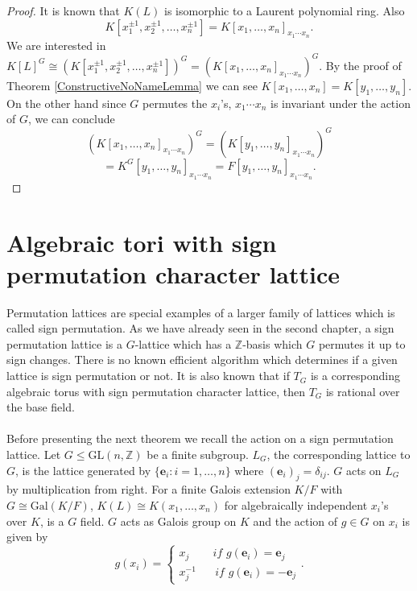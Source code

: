 \documentclass{article}
\theoremstyle{plain}
\theoremstyle{definition}
\newcommand{\Z}{\ensuremath{\mathbb{Z}}}
\begin{document}
\begin{proof}
It is known that $K(L)$ is isomorphic to a Laurent polynomial ring. Also $$K[x^{\pm 1}_1, x^{\pm 1}_2, \ldots , x^{\pm 1}_n] = K[x_1, \ldots , x_n]_{x_1\cdots x_n}.$$ We are interested in $K[L]^G \cong \left( K[x^{\pm 1}_1, x^{\pm 1}_2, \ldots , x^{\pm 1}_n] \right)^G = \left(K[x_1, \ldots , x_n]_{x_1\cdots x_n} \right) ^G.$ By the proof of Theorem \ref{ConstructiveNoNameLemma} we can see $K[x_1, \ldots , x_n] = K[y_1, \ldots , y_n]$. 
On the other hand since $G$ permutes the $x_i$'s, $x_1\cdots x_n$ is invariant under the action of $G$, we can conclude $$\left( K[x_1, \ldots , x_n]_{x_1\cdots x_n}\right)^G =  \left( K[y_1, \ldots , y_n]_{x_1\cdots x_n} \right)^G$$$$ = K^G [y_1, \ldots , y_n]_{x_1\cdots x_n} =  F[y_1, \ldots , y_n]_{x_1\cdots x_n}.$$ 
\end{proof}

\section{Algebraic tori with sign permutation character lattice}
Permutation lattices are special examples of a larger family of lattices which is called sign permutation. As we have already seen in the second chapter, a sign permutation lattice is a $G$-lattice which has a $\Z$-basis which $G$ permutes it up to sign changes. There is no known efficient algorithm which determines if a given lattice is sign permutation or not. It is also known that if $T_G$ is a corresponding algebraic torus with sign permutation character lattice, then $T_G$ is rational over the base field. \\
\\
Before presenting the next theorem we recall the action on a sign permutation lattice. Let $G \leq \mathrm{GL}(n,\Z)$ be a finite subgroup. $L_G$, the corresponding lattice to $G$, is the lattice generated by $\lbrace \textbf{e}_i: i = 1, \ldots , n \rbrace$ where $(\textbf{e}_i)_j = \delta_{ij}$. $G$ acts on $L_G$ by multiplication from right. For a finite Galois extension $K/F$ with $G \cong \mathrm{Gal}(K/F)$, $K(L) \cong K(x_1, \ldots, x_n)$ for algebraically independent $x_i$'s over $K$, is a $G$ field. $G$ acts as Galois group on $K$ and the action of $g \in G$ on $x_i$ is given by $$g(x_i) = \begin{cases} x_j \hspace{25pt} if \,\, g(\textbf{e}_i) = \textbf{e}_j \\
x^{-1}_j \hspace{20pt} if \,\, g(\textbf{e}_i) = -\textbf{e}_j \end{cases}
.$$
\end{document}
